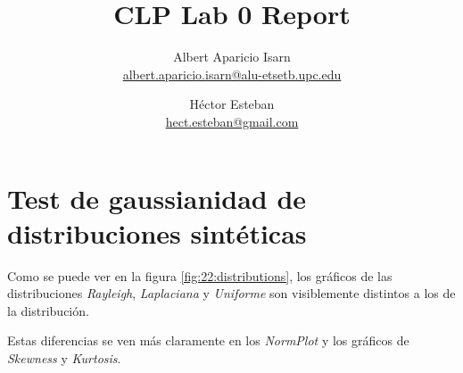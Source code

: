 \documentclass[11pt]{article} %
\title{CLP Lab 0 Report}
\author{Albert Aparicio Isarn\\
	\url{albert.aparicio.isarn@alu-etsetb.upc.edu}
	\and 
	Héctor Esteban\\
	\url{hect.esteban@gmail.com}}
\date{} %
\begin{document}
\maketitle

\section{Test de gaussianidad de distribuciones sintéticas}

Como se puede ver en la figura \ref{fig:22:distributions}, los gráficos de las distribuciones \emph{Rayleigh}, \emph{Laplaciana} y \emph{Uniforme} son visiblemente distintos a los de la distribución. 

Estas diferencias se ven más claramente en los \emph{NormPlot} y los gráficos de \emph{Skewness} y \emph{Kurtosis}.
\end{document}
